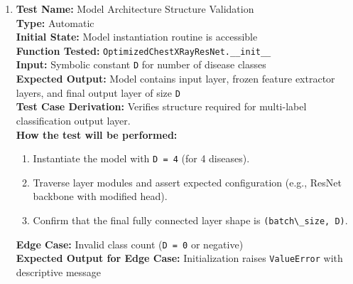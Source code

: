 \documentclass[12pt, titlepage]{article}
\begin{document}
\begin{enumerate}
  \item \textbf{Test Name:} Model Architecture Structure Validation\\
  \textbf{Type:} Automatic\\
  \textbf{Initial State:} Model instantiation routine is accessible\\
  \textbf{Function Tested:} \verb|OptimizedChestXRayResNet.__init__|\\
  \textbf{Input:} Symbolic constant \verb|D| for number of disease classes\\
  \textbf{Expected Output:} Model contains input layer, frozen feature extractor layers, and final output layer of size \verb|D|\\
  \textbf{Test Case Derivation:} Verifies structure required for multi-label classification output layer.\\
  \textbf{How the test will be performed:}
  \begin{enumerate}
    \item Instantiate the model with \verb|D = 4| (for 4 diseases).
    \item Traverse layer modules and assert expected configuration (e.g., ResNet backbone with modified head).
    \item Confirm that the final fully connected layer shape is \verb|(batch\_size, D)|. 
  \end{enumerate}
  \textbf{Edge Case:} Invalid class count (\verb|D = 0| or negative)\\
  \textbf{Expected Output for Edge Case:} Initialization raises \verb|ValueError| with descriptive message\\
  \vspace{1em}


\end{enumerate}
\end{document}
